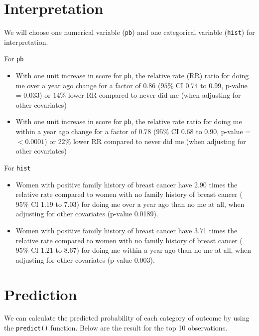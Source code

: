 \documentclass[
  10pt,
]{krantz}
\providecommand{\tightlist}{%
  \setlength{\itemsep}{0pt}\setlength{\parskip}{0pt}}
\begin{document}
\hypertarget{interpretation}{%
\section{Interpretation}\label{interpretation}}

We will choose one numerical variable (\texttt{pb}) and one categorical variable (\texttt{hist}) for interpretation.

For \texttt{pb}

\begin{itemize}
\tightlist
\item
  With one unit increase in score for \texttt{pb}, the relative rate (RR) ratio for doing me over a year ago change for a factor of 0.86 (\(95\%\) CI 0.74 to 0.99, p-value = 0.033) or \(14\%\) lower RR compared to never did me (when adjusting for other covariates)\\
\item
  With one unit increase in score for \texttt{pb}, the relative rate ratio for doing me within a year ago change for a factor of 0.78 (\(95\%\) CI 0.68 to 0.90, p-value = \(< 0.0001\)) or \(22\%\) lower RR compared to never did me (when adjusting for other covariates)
\end{itemize}

For \texttt{hist}

\begin{itemize}
\tightlist
\item
  Women with positive family history of breast cancer have 2.90 times the relative rate compared to women with no family history of breast cancer (\(95\%\) CI 1.19 to 7.03) for doing me over a year ago than no me at all, when adjusting for other covariates (p-value 0.0189).\\
\item
  Women with positive family history of breast cancer have 3.71 times the relative rate compared to women with no family history of breast cancer (\(95\%\) CI 1.21 to 8.67) for doing me within a year ago than no me at all, when adjusting for other covariates (p-value 0.003).
\end{itemize}

\hypertarget{prediction-1}{%
\section{Prediction}\label{prediction-1}}

We can calculate the predicted probability of each category of outcome by using the \texttt{predict()} function. Below are the result for the top 10 observations.
\end{document}
